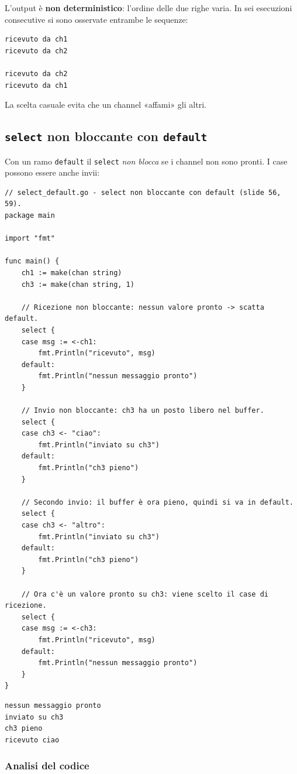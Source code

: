 \documentclass[11pt,a4paper]{report}
\newcommand{\cod}[1]{\texttt{#1}}
\begin{document}
L'output è \textbf{non deterministico}: l'ordine delle due righe varia. In sei
esecuzioni consecutive si sono osservate entrambe le sequenze:

\begin{lstlisting}[style=output]
ricevuto da ch1
ricevuto da ch2

ricevuto da ch2
ricevuto da ch1
\end{lstlisting}

La scelta casuale evita che un channel «affami» gli altri.

\subsection{\texttt{select} non bloccante con \texttt{default}}

Con un ramo \cod{default} il \cod{select} \emph{non blocca} se i channel non sono
pronti. I case possono essere anche invii:

\begin{lstlisting}[style=gocode,caption={\texttt{06\_concurrency/select\_default.go}}]
// select_default.go - select non bloccante con default (slide 56, 59).
package main

import "fmt"

func main() {
	ch1 := make(chan string)
	ch3 := make(chan string, 1)

	// Ricezione non bloccante: nessun valore pronto -> scatta default.
	select {
	case msg := <-ch1:
		fmt.Println("ricevuto", msg)
	default:
		fmt.Println("nessun messaggio pronto")
	}

	// Invio non bloccante: ch3 ha un posto libero nel buffer.
	select {
	case ch3 <- "ciao":
		fmt.Println("inviato su ch3")
	default:
		fmt.Println("ch3 pieno")
	}

	// Secondo invio: il buffer è ora pieno, quindi si va in default.
	select {
	case ch3 <- "altro":
		fmt.Println("inviato su ch3")
	default:
		fmt.Println("ch3 pieno")
	}

	// Ora c'è un valore pronto su ch3: viene scelto il case di ricezione.
	select {
	case msg := <-ch3:
		fmt.Println("ricevuto", msg)
	default:
		fmt.Println("nessun messaggio pronto")
	}
}
\end{lstlisting}
\begin{lstlisting}[style=output]
nessun messaggio pronto
inviato su ch3
ch3 pieno
ricevuto ciao
\end{lstlisting}

\subsubsection*{Analisi del codice}
\end{document}
